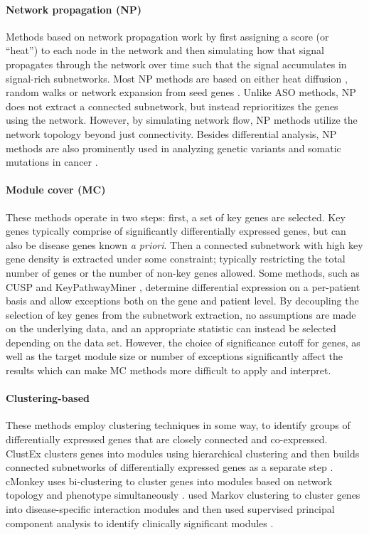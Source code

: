 \paragraph{Network propagation (NP)} Methods based on network propagation work by first assigning a score (or \enquote{heat}) to each node in the network and then simulating how that signal propagates through the network over time such that the signal accumulates in signal-rich subnetworks. Most NP methods are based on either heat diffusion \cite{Vandin2012,Paull2013}, random walks \cite{Erten2011,Komurov2012} or network expansion from seed genes \cite{Breitling2004,Nacu2007}. Unlike ASO methods, NP does not extract a connected subnetwork, but instead reprioritizes the genes using the network. However, by simulating network flow, NP methods utilize the network topology beyond just connectivity. Besides differential analysis, NP methods are also prominently used in analyzing genetic variants and somatic mutations in cancer \cite{Leiserson2014,Cowen2017,Zhang2018,Carlin2019}.

\paragraph{Module cover (MC)} These methods operate in two steps: first, a set of key genes are selected. Key genes typically comprise of significantly differentially expressed genes, but can also be disease genes known \emph{a priori}. Then a connected subnetwork with high key gene density is extracted under some constraint; typically restricting the total number of genes or the number of non-key genes allowed. Some methods, such as CUSP \cite{Ulitsky2008} and KeyPathwayMiner \cite{Alcaraz2011}, determine differential expression on a per-patient basis and allow exceptions both on the gene and patient level. By decoupling the selection of key genes from the subnetwork extraction, no assumptions are made on the underlying data, and an appropriate statistic can instead be selected depending on the data set.  However, the choice of significance cutoff for genes, as well as the target module size or number of exceptions significantly affect the results \cite{Batra2017} which can make MC methods more difficult to apply and interpret.

\paragraph{Clustering-based} These methods employ clustering techniques in some way, to identify groups of differentially expressed genes that are closely connected and co-expressed. ClustEx clusters genes into modules using hierarchical clustering and then builds connected subnetworks of differentially expressed genes as a separate step \cite{Gu2010}. cMonkey uses bi-clustering to cluster genes into modules based on network topology and phenotype simultaneously \cite{Reiss2006}. \citeauthor{Wu2012} used Markov clustering to cluster genes into disease-specific interaction modules and then used supervised principal component analysis to identify clinically significant modules \cite{Wu2012}.

